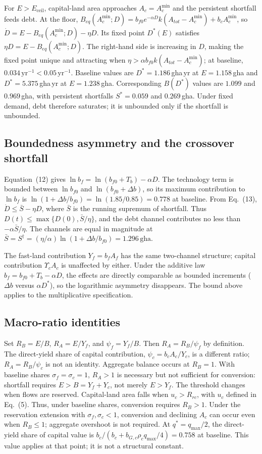 \documentclass[11pt,a4paper]{article}
\newcommand{\Ups}{\Upsilon_c}
\newcommand{\Eceil}{E_{\mathrm{ceil}}}
\newcommand{\Acmin}{A_c^{\min}}
\begin{document}
For $E>\Eceil$, capital-land area approaches $A_c=\Acmin$ and the persistent shortfall feeds debt. At the floor, $B_{eq}(\Acmin;D)=b_{f0}e^{-\alpha D}k(A_{tot}-\Acmin)+b_c\Acmin$, so $\dot D=E-B_{eq}(\Acmin;D)-\eta D$. Its fixed point $D^*(E)$ satisfies $\eta D=E-B_{eq}(\Acmin;D)$. The right-hand side is increasing in $D$, making the fixed point unique and attracting when $\eta>\alpha b_{f0}k(A_{tot}-\Acmin)$; at baseline, $0.034\,\mathrm{yr}^{-1}<0.05\,\mathrm{yr}^{-1}$. Baseline values are $D^*=1.186$\,gha\,yr at $E=1.158$\,gha and $D^*=5.375$\,gha\,yr at $E=1.238$\,gha. Corresponding $B(D^*)$ values are $1.099$ and $0.969$\,gha, with persistent shortfalls $S^*=0.059$ and $0.269$\,gha. Under fixed demand, debt therefore saturates; it is unbounded only if the shortfall is unbounded.

\subsection{Boundedness asymmetry and the crossover shortfall}\label{si:bounded}

Equation~(12) gives $\ln b_f=\ln(b_{f0}+T_b)-\alpha D$. The technology term is bounded between $\ln b_{f0}$ and $\ln(b_{f0}+\Delta b)$, so its maximum contribution to $\ln b_f$ is $\ln(1+\Delta b/b_{f0})=\ln(1.85/0.85)=0.778$ at baseline. From Eq.~(13), $\dot D\le\bar S-\eta D$, where $\bar S$ is the running supremum of shortfall. Thus $D(t)\le\max\{D(0),\bar S/\eta\}$, and the debt channel contributes no less than $-\alpha\bar S/\eta$. The channels are equal in magnitude at $\bar S=S^\dagger=(\eta/\alpha)\ln(1+\Delta b/b_{f0})=1.296\,\mathrm{gha}$.

The fast-land contribution $Y_f=b_fA_f$ has the same two-channel structure; capital contribution $\Ups A_c$ is unaffected by either. Under the additive law $b_f=b_{f0}+T_b-\alpha D$, the effects are directly comparable as bounded increments ($\Delta b$ versus $\alpha D^*$), so the logarithmic asymmetry disappears. The bound above applies to the multiplicative specification.

\subsection{Macro-ratio identities}\label{si:ratios}

Set $R_B=E/B$, $R_A=E/Y_f$, and $\psi_f=Y_f/B$. Then $R_A=R_B/\psi_f$ by definition. The direct-yield share of capital contribution, $\psi_c=b_cA_c/Y_c$, is a different ratio; $R_A=R_B/\psi_c$ is not an identity. Aggregate balance occurs at $R_B=1$. With baseline shares $\sigma_f=\sigma_c=1$, $R_A>1$ is necessary but not sufficient for conversion: shortfall requires $E>B=Y_f+Y_c$, not merely $E>Y_f$. The threshold changes when flows are reserved. Capital-land area falls when $u_c>R_{rc}$, with $u_c$ defined in Eq.~(5). Thus, under baseline shares, conversion requires $R_B>1$. Under the reservation extension with $\sigma_f,\sigma_c<1$, conversion and declining $A_c$ can occur even when $R_B\le1$; aggregate overshoot is not required. At $q^*=q_{\max}/2$, the direct-yield share of capital value is $b_c/(b_c+b_{G,c}\rho_cq_{\max}/4)=0.758$ at baseline. This value applies at that point; it is not a structural constant.
\end{document}
